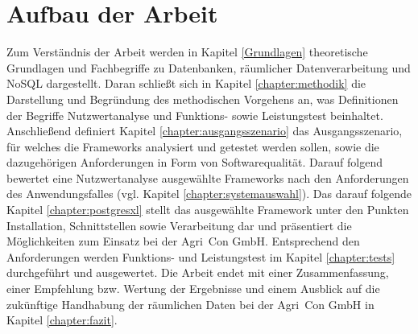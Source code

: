 \section{Aufbau der Arbeit}
Zum Verständnis der Arbeit werden in Kapitel \ref{Grundlagen} theoretische Grundlagen und Fachbegriffe zu Datenbanken, räumlicher Datenverarbeitung und NoSQL dargestellt.
Daran schließt sich in Kapitel \ref{chapter:methodik} die Darstellung und Begründung des methodischen Vorgehens an, was Definitionen der Begriffe Nutzwertanalyse und Funktions- sowie Leistungstest beinhaltet.
Anschließend definiert Kapitel \ref{chapter:ausgangsszenario} das Ausgangsszenario, für welches die Frameworks analysiert und getestet werden sollen, sowie die dazugehörigen Anforderungen in Form von Softwarequalität.
Darauf folgend bewertet eine Nutzwertanalyse ausgewählte Frameworks nach den Anforderungen des Anwendungsfalles (vgl. Kapitel \ref{chapter:systemauswahl}).
Das darauf folgende Kapitel \ref{chapter:postgresxl} stellt das ausgewählte Framework unter den Punkten Installation, Schnittstellen sowie Verarbeitung dar und präsentiert die Möglichkeiten zum Einsatz bei der Agri~Con GmbH.
Entsprechend den Anforderungen werden Funktions- und Leistungstest im Kapitel \ref{chapter:tests} durchgeführt und ausgewertet.
Die Arbeit endet mit einer Zusammenfassung, einer Empfehlung bzw. Wertung der Ergebnisse und einem Ausblick auf die zukünftige Handhabung der räumlichen Daten bei der Agri~Con GmbH in Kapitel \ref{chapter:fazit}.



